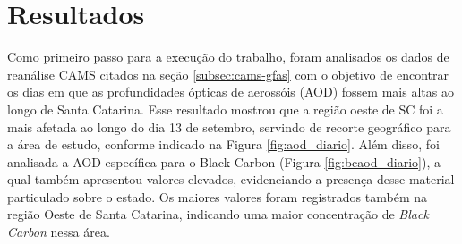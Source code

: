 \chapter{Resultados}

Como primeiro passo para a execução do trabalho, foram analisados os dados de reanálise CAMS citados na seção \ref{subsec:cams-gfas} com o objetivo de encontrar os dias em que as profundidades ópticas de aerossóis (AOD) fossem mais altas ao longo de Santa Catarina. Esse resultado mostrou que a região oeste de SC foi a mais afetada ao longo do dia 13 de setembro, servindo de recorte geográfico para a área de estudo, conforme indicado na Figura \ref{fig:aod_diario}. Além disso, foi analisada a AOD específica para o Black Carbon (Figura \ref{fig:bcaod_diario}), a qual também apresentou valores elevados, evidenciando a presença desse material particulado sobre o estado. Os maiores valores foram registrados também na região Oeste de Santa Catarina, indicando uma maior concentração de \textit{Black Carbon} nessa área.

